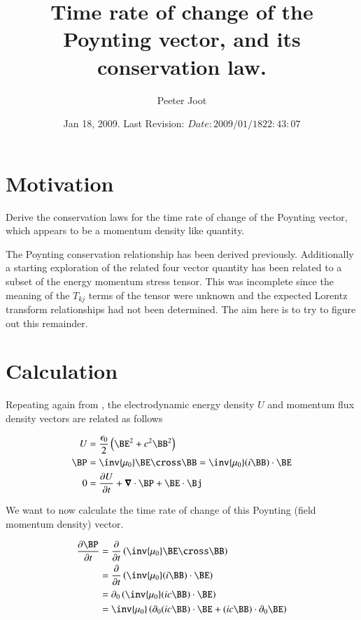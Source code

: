 \documentclass{article}
\title{ Time rate of change of the Poynting vector, and its conservation law. }
\author{Peeter Joot}
\date{ Jan 18, 2009.  Last Revision: $Date: 2009/01/18 22:43:07 $ }
\begin{document}
\maketitle{}
\tableofcontents

\section{ Motivation }

Derive the conservation laws for the time rate of change of the Poynting vector, which appears to be a momentum density like quantity.

The Poynting conservation relationship has been derived previously.  Additionally a starting
exploration
\cite{PJemstresstensor}
of the related four vector quantity has been related to a subset of the energy momentum stress tensor.
This was incomplete since the meaning of the $T_{kj}$ terms of the tensor were unknown and the expected
Lorentz transform relationships had not been determined.  The aim here is to try to figure out this remainder.

\section{ Calculation }

Repeating again from \cite{PJpoynting}, the electrodynamic energy density $U$ and momentum flux density vectors are related as follows

\begin{align}\label{eqn:fromPoyntingNotes}
U &= \frac{\epsilon_0}{2}\left( \BE^2 + c^2 \BB^2 \right) \\
\BP &= \inv{\mu_0}\BE \cross \BB = \inv{\mu_0} (i \BB) \cdot \BE \\
0 &= \PD{t}{U} + \spacegrad \cdot \BP + \BE \cdot \Bj
\end{align}

We want to now calculate the time rate of change of this Poynting (field momentum density) vector.

\begin{align*}
\PD{t}{\BP}
&= \PD{t}{} \left( \inv{\mu_0} \BE \cross \BB \right) \\
&= \PD{t}{} \left( \inv{\mu_0}(i\BB) \cdot \BE \right) \\
&= \partial_0 \left( \inv{\mu_0}(i c\BB) \cdot \BE \right) \\
&= \inv{\mu_0} \left( \partial_0 (i c\BB) \cdot \BE  + (i c\BB) \cdot \partial_0 \BE  \right)
\end{align*}
\end{document}
